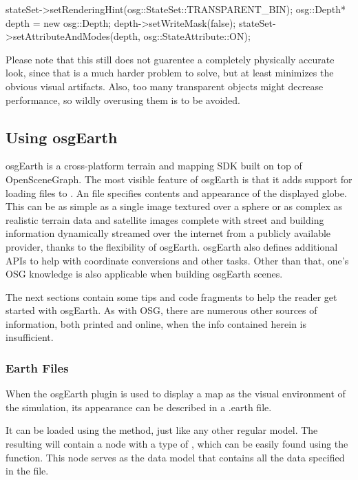 \begin{cpp}
stateSet->setRenderingHint(osg::StateSet::TRANSPARENT_BIN);
osg::Depth* depth = new osg::Depth;
depth->setWriteMask(false);
stateSet->setAttributeAndModes(depth, osg::StateAttribute::ON);
\end{cpp}

Please note that this still does not guarentee a completely physically accurate
look, since that is a much harder problem to solve, but at least minimizes the
obvious visual artifacts. Also, too many transparent objects might decrease
performance, so wildly overusing them is to be avoided.


\subsection{Using osgEarth}
\label{sec:graphics:using-osgearth}

osgEarth is a cross-platform terrain and mapping SDK built on top of OpenSceneGraph.
The most visible feature of osgEarth is that it adds support for loading 
files to . An  file specifies contents and
appearance of the displayed globe. This can be as simple as a single image
textured over a sphere or as complex as realistic terrain data and
satellite images complete with street and building information dynamically
streamed over the internet from a publicly available provider, thanks to
the flexibility of osgEarth. osgEarth also defines additional APIs
to help with coordinate conversions and other tasks. Other than that,
one's OSG knowledge is also applicable when building osgEarth scenes.

The next sections contain some tips and code fragments to help the reader get
started with osgEarth. As with OSG, there are numerous other sources of
information, both printed and online, when the info contained herein
is insufficient.


\subsubsection{Earth Files}
\label{sec:graphics:earth-files}

When the osgEarth plugin is used to display a map as the visual environment
of the simulation, its appearance can be described in a .earth file.

It can be loaded using the  method, just like any
other regular model. The resulting  will contain a node with a
type of , which can be easily found using the
 function. This node serves as the
data model that contains all the data specified in the  file.

